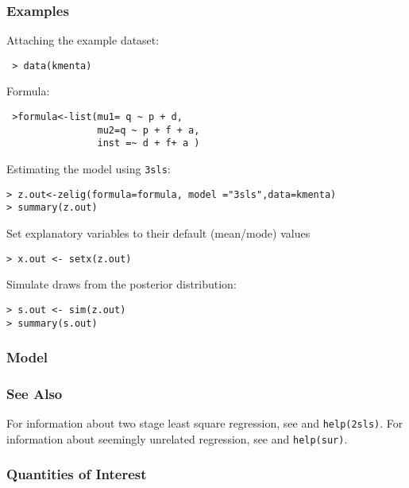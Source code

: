 \subsubsection{Examples}
Attaching the example dataset:
 \begin{verbatim} 
 > data(kmenta)
 \end{verbatim}
 Formula:
\begin{verbatim}
 >formula<-list(mu1= q ~ p + d,
                mu2=q ~ p + f + a,
                inst =~ d + f+ a )
\end{verbatim}
Estimating the model using \texttt{3sls}:
\begin{verbatim}
> z.out<-zelig(formula=formula, model ="3sls",data=kmenta)
> summary(z.out)
\end{verbatim}

Set explanatory variables to their default (mean/mode) values
\begin{verbatim}
> x.out <- setx(z.out)
\end{verbatim}

Simulate draws from the posterior distribution:
\begin{verbatim}
> s.out <- sim(z.out)
> summary(s.out)
\end{verbatim}
\clearpage

\subsubsection{Model}
\subsubsection{See Also}
For information about two stage least square regression, see 
 and \texttt{help(2sls)}.
For information about seemingly unrelated regression, see
 and \texttt{help(sur)}.
\subsubsection{Quantities of Interest}
